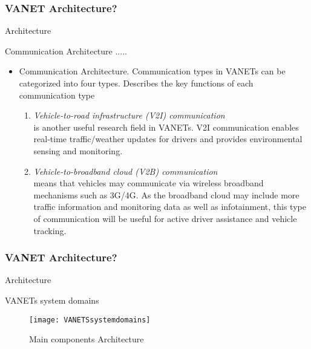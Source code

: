 \documentclass{beamer}
\begin{document}
\begin{frame}
	
	\frametitle{VANET Architecture?}
	\begin{block}{Architecture}
		\begin{block}{Communication Architecture .....}
			\begin{itemize}
				
				
				
				\item Communication Architecture. 
				Communication types in VANETs can be categorized into four types. 
				Describes the key functions of each communication type
				\begin{enumerate}
					\item \textit{Vehicle-to-road infrastructure (V2I) communication}\\ is another useful research field in VANETs. V2I communication enables real-time traffic/weather updates for drivers and provides environmental sensing and monitoring.
					
					\item \textit{Vehicle-to-broadband cloud (V2B) communication}\\ means that vehicles may communicate via wireless broadband mechanisms such as 3G/4G. As the broadband cloud may include more traffic information and monitoring data as well as infotainment, this type of communication will be useful for active driver assistance and vehicle tracking.
					
				\end{enumerate}
				
				
				
				
			\end{itemize}
		\end{block}
	\end{block}
	
\end{frame}
\begin{frame}
	
	\frametitle{VANET Architecture?}
	\begin{block}{Architecture}
		\begin{block}{VANETs system domains}
			\begin{figure}
				\centering
				\texttt{[image: VANETSsystemdomains]}
				\caption{Main components Architecture
				}
				\label{fig:VANETSsystemdomains}
			\end{figure}
			
		\end{block}
	\end{block}
	
\end{frame}
\end{document}
